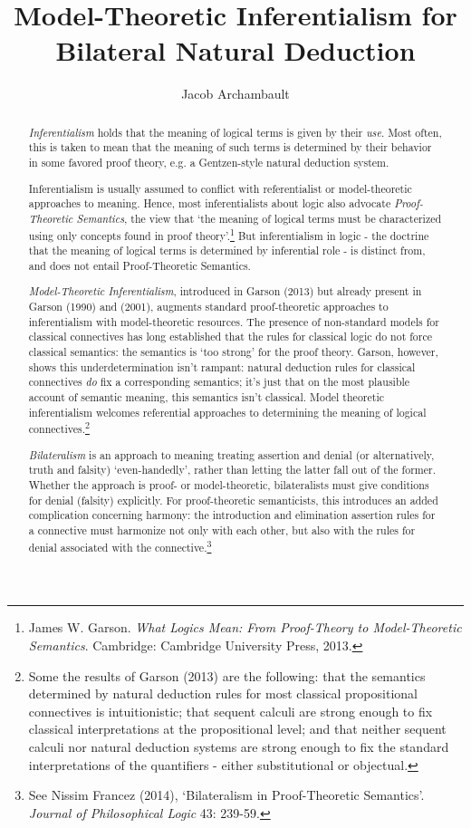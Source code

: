 \documentclass[]{article}
\title{Model-Theoretic Inferentialism for Bilateral Natural Deduction}
\author{Jacob Archambault}
\begin{document}
\maketitle

\begin{abstract}
\textit{Inferentialism} holds that the meaning of logical terms is given by their \textit{use}. Most often, this is taken to mean that the meaning of such terms is determined by their behavior in some favored proof theory, e.g. a Gentzen-style natural deduction system.

Inferentialism is usually assumed to conflict with referentialist or model-theoretic approaches to meaning. Hence, most inferentialists about logic also advocate \textit{Proof-Theoretic Semantics}, the view that `the meaning of logical terms must be characterized using only concepts found in proof theory'.\footnote{James W. Garson. \textit{What Logics Mean: From Proof-Theory to Model-Theoretic Semantics}. Cambridge: Cambridge University Press, 2013.} But inferentialism in logic - the doctrine that the meaning of logical terms is determined by inferential role - is distinct from, and does not entail Proof-Theoretic Semantics.

\textit{Model-Theoretic Inferentialism}, introduced in Garson (2013) but already present in Garson (1990) and (2001), augments standard proof-theoretic approaches to inferentialism with model-theoretic resources. The presence of non-standard models for classical connectives has long established that the rules for classical logic do not force classical semantics: the semantics is `too strong' for the proof theory. Garson, however, shows this underdetermination isn't rampant: natural deduction rules for classical connectives \textit{do} fix a corresponding semantics; it's just that on the most plausible account of semantic meaning, this semantics isn't classical. Model theoretic inferentialism welcomes referential approaches to determining the meaning of logical connectives.\footnote{Some the results of Garson (2013) are the following: that the semantics determined by natural deduction rules for most classical propositional connectives is intuitionistic; that sequent calculi are strong enough to fix classical interpretations at the propositional level; and that neither sequent calculi nor natural deduction systems are strong enough to fix the standard interpretations of the quantifiers - either substitutional or objectual.}

\textit{Bilateralism} is an approach to meaning treating assertion and denial (or alternatively, truth and falsity) `even-handedly', rather than letting the latter fall out of the former. Whether the approach is proof- or model-theoretic, bilateralists must give conditions for denial (falsity) explicitly. For proof-theoretic semanticists, this introduces an added complication concerning harmony: the introduction and elimination assertion rules for a connective must harmonize not only with each other, but also with the rules for denial associated with the connective.\footnote{See Nissim Francez (2014), `Bilateralism in Proof-Theoretic Semantics'. \textit{Journal of Philosophical Logic} 43: 239-59.}


\end{abstract}
\end{document}
